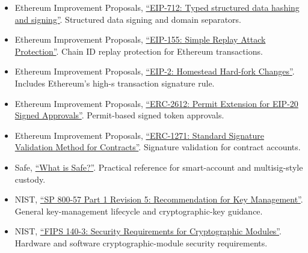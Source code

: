 \begin{itemize}
  \href{https://eips.ethereum.org/EIPS/eip-191}{``EIP-191: Signed Data
  Standard''}. Ethereum signed-data prefixing and versioning.
\item
  Ethereum Improvement Proposals,
  \href{https://eips.ethereum.org/EIPS/eip-712}{``EIP-712: Typed
  structured data hashing and signing''}. Structured data signing and
  domain separators.
\item
  Ethereum Improvement Proposals,
  \href{https://eips.ethereum.org/EIPS/eip-155}{``EIP-155: Simple Replay
  Attack Protection''}. Chain ID replay protection for Ethereum
  transactions.
\item
  Ethereum Improvement Proposals,
  \href{https://eips.ethereum.org/EIPS/eip-2}{``EIP-2: Homestead
  Hard-fork Changes''}. Includes Ethereum's high-s transaction signature
  rule.
\item
  Ethereum Improvement Proposals,
  \href{https://eips.ethereum.org/EIPS/eip-2612}{``ERC-2612: Permit
  Extension for EIP-20 Signed Approvals''}. Permit-based signed token
  approvals.
\item
  Ethereum Improvement Proposals,
  \href{https://eips.ethereum.org/EIPS/eip-1271}{``ERC-1271: Standard
  Signature Validation Method for Contracts''}. Signature validation for
  contract accounts.
\item
  Safe, \href{https://docs.safe.global/home/what-is-safe}{``What is
  Safe?''}. Practical reference for smart-account and multisig-style
  custody.
\item
  NIST,
  \href{https://nvlpubs.nist.gov/nistpubs/SpecialPublications/NIST.SP.800-57pt1r5.pdf}{``SP
  800-57 Part 1 Revision 5: Recommendation for Key Management''}.
  General key-management lifecycle and cryptographic-key guidance.
\item
  NIST,
  \href{https://nvlpubs.nist.gov/nistpubs/FIPS/NIST.FIPS.140-3.pdf}{``FIPS
  140-3: Security Requirements for Cryptographic Modules''}. Hardware
  and software cryptographic-module security requirements.
\end{itemize}
